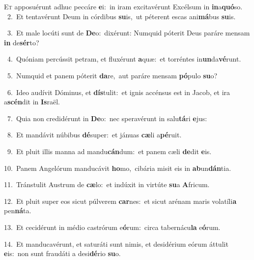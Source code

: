 \lettrine{\initial\textcolor{\initialcolor}{E}}{t} apposuérunt adhuc peccáre \textbf{e}\-i:~\star in iram excitavérunt Excélsum in \textbf{in}\-a\-\textbf{quó}\-so.\\
{\numbfont\textcolor{\numbcolor}{~2.}}~Et tentavérunt Deum in córdibus \textbf{su}\-is,~\star ut péterent escas ani\-\textbf{má}\-bus \textbf{su}\-is.\par
{\numbfont\textcolor{\numbcolor}{~3.}}~Et male locúti sunt de \textbf{De}\-o:~\star dixérunt: Numquid póterit Deus paráre mensam \textbf{in} de\-\textbf{sér}\-to?\par
{\numbfont\textcolor{\numbcolor}{~4.}}~Quóniam percússit petram, et fluxérunt \textbf{a}\-quæ:~\star et torréntes in\-\textbf{un}\-da\-\textbf{vé}\-runt.\par
{\numbfont\textcolor{\numbcolor}{~5.}}~Numquid et panem póterit \textbf{da}\-re,~\star aut paráre mensam \textbf{pó}\-pulo \textbf{su}\-o?\par
{\numbfont\textcolor{\numbcolor}{~6.}}~Ideo audívit Dóminus, et \textbf{dís}\-tulit:~\star et ignis accénsus est in Jacob, et ira a\-\textbf{scén}\-dit in \textbf{Is}\-raël.\par
{\numbfont\textcolor{\numbcolor}{~7.}}~Quia non credidérunt in \textbf{De}\-o:~\star nec speravérunt in salu\-\textbf{tá}\-ri \textbf{e}\-jus:\par
{\numbfont\textcolor{\numbcolor}{~8.}}~Et mandávit núbibus \textbf{dé}\-super:~\star et jánuas \textbf{cæ}\-li a\-\textbf{pé}\-ruit.\par
{\numbfont\textcolor{\numbcolor}{~9.}}~Et pluit illis manna ad mandu\-\textbf{cán}\-dum:~\star et panem cæli \textbf{de}\-dit \textbf{e}\-is.\par
{\numbfont\textcolor{\numbcolor}{10.}}~Panem Angelórum manducávit \textbf{ho}\-mo,~\star cibária misit eis in \textbf{ab}\-un\-\textbf{dán}\-tia.\par
{\numbfont\textcolor{\numbcolor}{11.}}~Tránstulit Austrum de \textbf{cæ}\-lo:~\star et indúxit in virtúte \textbf{su}\-a \textbf{A}\-fricum.\par
{\numbfont\textcolor{\numbcolor}{12.}}~Et pluit super eos sicut púlverem \textbf{car}\-nes:~\star et sicut arénam maris volatíli\textbf{a} pen\-\textbf{ná}\-ta.\par
{\numbfont\textcolor{\numbcolor}{13.}}~Et cecidérunt in médio castrórum e\-\textbf{ó}\-rum:~\star circa tabernácu\textbf{la} e\-\textbf{ó}\-rum.\par
{\numbfont\textcolor{\numbcolor}{14.}}~Et manducavérunt, et saturáti sunt nimis, et desidérium eórum áttulit \textbf{e}\-is:~\star non sunt fraudáti a desi\-\textbf{dé}\-rio \textbf{su}\-o.\par

